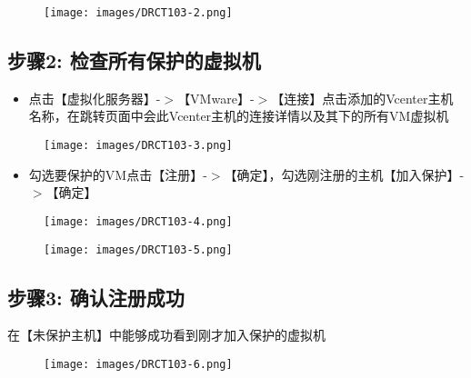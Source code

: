 \begin{figure}[htbp]
\centering
\texttt{[image: images/DRCT103-2.png]}
\end{figure}

\subsection{步骤2: 检查所有保护的虚拟机}
\label{步骤2:检查所有保护的虚拟机}

\begin{itemize}
\item 点击【虚拟化服务器】-$>$【VMware】-$>$【连接】点击添加的Vcenter主机名称，在跳转页面中会此Vcenter主机的连接详情以及其下的所有VM虚拟机

\end{itemize}

\begin{figure}[htbp]
\centering
\texttt{[image: images/DRCT103-3.png]}
\end{figure}

\begin{itemize}
\item 勾选要保护的VM点击【注册】-$>$【确定】，勾选刚注册的主机【加入保护】-$>$【确定】

\end{itemize}

\begin{figure}[htbp]
\centering
\texttt{[image: images/DRCT103-4.png]}
\end{figure}

\begin{figure}[htbp]
\centering
\texttt{[image: images/DRCT103-5.png]}
\end{figure}

\subsection{步骤3: 确认注册成功}
\label{步骤3:确认注册成功}

在【未保护主机】中能够成功看到刚才加入保护的虚拟机

\begin{figure}[htbp]
\centering
\texttt{[image: images/DRCT103-6.png]}
\end{figure}

